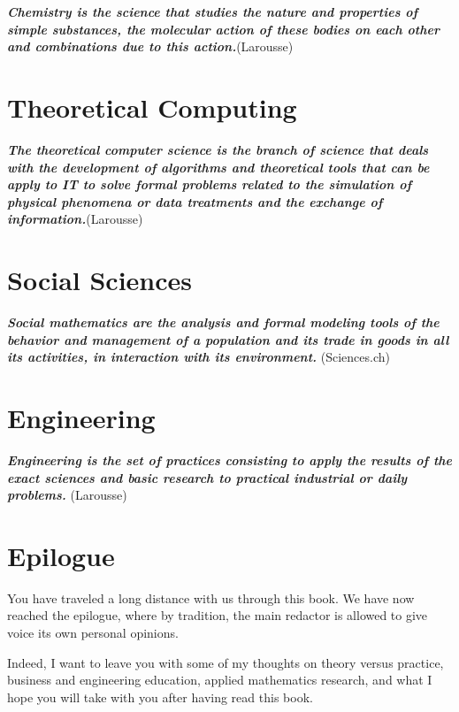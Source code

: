 \documentclass[12pt,a4paper,twoside,openright]{report}
\theoremstyle{definition}
\theoremstyle{itexmp}
\numberwithin{equation}{section}
\begin{document}
	\textit{\textbf{Chemistry is the science that studies the nature and properties of simple substances, the molecular action of these bodies on each other and combinations due to this action.}}(Larousse)
	\minitoc
	\pagebreak 
	
	
	
\chapter{Theoretical Computing}

	\textit{\textbf{The theoretical computer science is the branch of science that deals with the development of algorithms and theoretical tools that can be apply to IT to solve formal problems related to the simulation of physical phenomena or data treatments and the exchange of information.}}(Larousse)
	\minitoc
	\pagebreak 
	
	
	
\chapter{Social Sciences}

	\textit{\textbf{Social mathematics are the analysis and formal modeling tools of the behavior and management of a population and its trade in goods in all its activities, in interaction with its environment.}} (Sciences.ch)
	\minitoc
	\pagebreak
	
	
		
\chapter{Engineering}

	\textit{\textbf{Engineering is the set of practices consisting to apply the results of the exact sciences and basic research to practical industrial or daily problems.}} (Larousse)
	\minitoc
	\pagebreak
	

	
	
 	\chapter{Epilogue}
	You have traveled a long distance with us through this book. We have now reached the epilogue, where by tradition, the main redactor is allowed to give voice its own personal opinions. 

	Indeed, I want to leave you with some of my thoughts on theory versus practice, business and engineering education, applied mathematics research, and what I hope you will take with you after having read this book.
	
\end{document}
